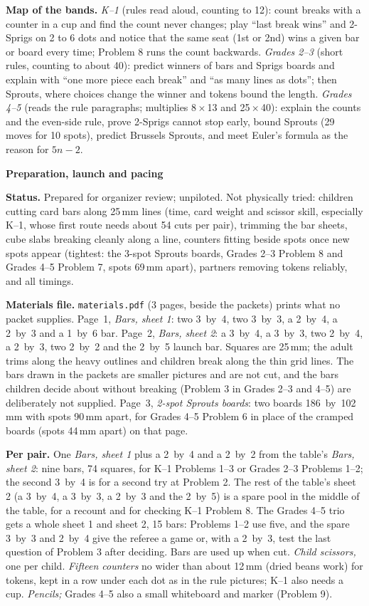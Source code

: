 \documentclass[11pt]{article}
\newcommand{\head}[1]{\par\textbf{\large #1}\par}
\newcommand{\by}{\,$\times$\,}
\begin{document}
\textbf{Map of the bands.} \emph{K--1} (rules read aloud, counting to 12): count breaks with a counter in a cup and find the count never changes; play ``last break wins'' and 2-Sprigs on 2 to 6 dots and notice that the same seat (1st or 2nd) wins a given bar or board every time; Problem 8 runs the count backwards. \emph{Grades 2--3} (short rules, counting to about 40): predict winners of bars and Sprigs boards and explain with ``one more piece each break'' and ``as many lines as dots''; then Sprouts, where choices change the winner and tokens bound the length. \emph{Grades 4--5} (reads the rule paragraphs; multiplies 8\by13 and 25\by40): explain the counts and the even-side rule, prove 2-Sprigs cannot stop early, bound Sprouts (29 moves for 10 spots), predict Brussels Sprouts, and meet Euler's formula as the reason for $5n-2$.

\head{Preparation, launch and pacing}
\textbf{Status.} Prepared for organizer review; unpiloted. Not physically tried: children cutting card bars along 25\,mm lines (time, card weight and scissor skill, especially K--1, whose first route needs about 54 cuts per pair), trimming the bar sheets, cube slabs breaking cleanly along a line, counters fitting beside spots once new spots appear (tightest: the 3-spot Sprouts boards, Grades 2--3 Problem 8 and Grades 4--5 Problem 7, spots 69\,mm apart), partners removing tokens reliably, and all timings.

\textbf{Materials file.} \texttt{materials.pdf} (3 pages, beside the packets) prints what no packet supplies. Page~1, \emph{Bars, sheet 1}: two 3~by~4, two 3~by~3, a 2~by~4, a 2~by~3 and a 1~by~6 bar. Page~2, \emph{Bars, sheet 2}: a 3~by~4, a 3~by~3, two 2~by~4, a 2~by~3, two 2~by~2 and the 2~by~5 launch bar. Squares are 25\,mm; the adult trims along the heavy outlines and children break along the thin grid lines. The bars drawn in the packets are smaller pictures and are not cut, and the bars children decide about without breaking (Problem 3 in Grades 2--3 and 4--5) are deliberately not supplied. Page~3, \emph{2-spot Sprouts boards}: two boards 186~by~102\,mm with spots 90\,mm apart, for Grades 4--5 Problem 6 in place of the cramped boards (spots 44\,mm apart) on that page.

\textbf{Per pair.} One \emph{Bars, sheet 1} plus a 2~by~4 and a 2~by~2 from the table's \emph{Bars, sheet 2}: nine bars, 74 squares, for K--1 Problems 1--3 or Grades 2--3 Problems 1--2; the second 3~by~4 is for a second try at Problem 2. The rest of the table's sheet 2 (a 3~by~4, a 3~by~3, a 2~by~3 and the 2~by~5) is a spare pool in the middle of the table, for a recount and for checking K--1 Problem 8. The Grades 4--5 trio gets a whole sheet 1 and sheet 2, 15 bars: Problems 1--2 use five, and the spare 3~by~3 and 2~by~4 give the referee a game or, with a 2~by~3, test the last question of Problem 3 after deciding. Bars are used up when cut. \emph{Child scissors,} one per child. \emph{Fifteen counters} no wider than about 12\,mm (dried beans work) for tokens, kept in a row under each dot as in the rule pictures; K--1 also needs a cup. \emph{Pencils;} Grades 4--5 also a small whiteboard and marker (Problem 9).
\end{document}
